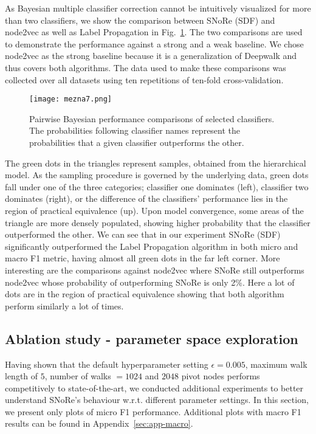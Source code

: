 \documentclass[twoside,11pt]{article}
\begin{document}
As Bayesian multiple classifier correction cannot be intuitively visualized for more than two classifiers, we show the comparison between SNoRe (SDF) and node2vec as well as Label Propagation in  Fig.~\ref{fig:bayes}. The two comparisons are used to demonstrate the performance against a strong and a weak baseline. We chose node2vec as the strong baseline because it is a generalization of Deepwalk and thus covers both algorithms. The data used to make these comparisons was collected over all datasets using ten repetitions of ten-fold cross-validation.

\begin{figure}[t!]
  \centering
  \texttt{[image: mezna7.png]}
  \caption{Pairwise Bayesian performance comparisons of selected classifiers. The probabilities following classifier names represent the probabilities that a given classifier outperforms the other.}
  \label{fig:bayes}
\end{figure}

The green dots in the triangles represent samples, obtained from the hierarchical model. As the sampling procedure is governed by the underlying data, green dots fall under one of the three categories; classifier one dominates (left), classifier two dominates (right), or the difference of the classifiers' performance lies in the region of practical equivalence (up). Upon model convergence, some areas of the triangle are more densely populated, showing higher probability that the classifier outperformed the other. We can see that in our experiment SNoRe (SDF) significantly outperformed the Label Propagation algorithm in both micro and macro F1 metric, having almost all green dots in the far left corner. More interesting are the comparisons against node2vec where SNoRe still outperforms node2vec whose probability of outperforming SNoRe is only 2\%. Here a lot of dots are in the region of practical equivalence showing that both algorithm perform similarly a lot of times.

\subsection{Ablation study - parameter space exploration}
Having shown that the default hyperparameter setting $\epsilon = 0.005$, maximum walk length of $5$, number of walks $= 1024$ and $2048$ pivot nodes performs competitively to state-of-the-art, we conducted additional experiments to better understand SNoRe's behaviour w.r.t. different parameter settings. In this section, we present only plots of micro F1 performance. Additional plots with macro F1 results can be found in  Appendix~\ref{sec:app-macro}.
\end{document}
